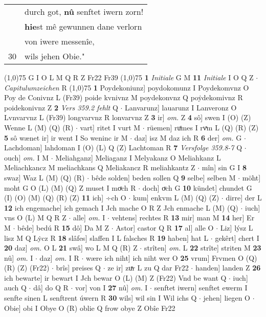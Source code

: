 \documentclass[8pt,a4paper,notitlepage]{article}
\begin{document}
\begin{table}[ht]
\begin{minipage}[t]{0.5\linewidth}
\begin{tabular}{rl}
 & durch got, \textbf{nû} senftet iwern zorn!\\ 
 & \textbf{hie}st mê gewunnen dane verlorn\\ 
 & von iwere messenîe,\\ 
30 & wils jehen Obie."\\ 
\end{tabular}
\scriptsize
\line(1,0){75} \newline
G I O L M Q R Z Fr22 Fr39 \newline
\line(1,0){75} \newline
\textbf{1} \textit{Initiale} G M  \textbf{11} \textit{Initiale} I O Q Z   $\cdot$ \textit{Capitulumzeichen} R  \newline
\line(1,0){75} \newline
\textbf{1} Poydekoniunz] poydokomunz I Poydekomvnz O Poy de Conivnz L (Fr39) poide kvnivnz M poydekonvnz Q poẏdekomivnz R poidekonivnz Z \textbf{2} \textit{Vers 359.2 fehlt} Q   $\cdot$ Lanvarunz] lauarunz I Lanveronz O Lvnvarvnz L (Fr39) longvarvnz R lonvarvnz Z \textbf{3} ir] \textit{om.} Z \textbf{4} sô] swen I (O) (Z) Wenne L (M) (Q) (R)  $\cdot$ vart] ritet I vurt M  $\cdot$ rüemen] ruͤmes I rvͯm L (Q) (R) (Z) \textbf{5} sô wænet ir] ir went I So weninc ir M  $\cdot$ daz] isz M daz ich R \textbf{6} der] \textit{om.} G  $\cdot$ Lachdoman] lahdoman I (O) (L) Q (Z) Lachtoman R \textbf{7} \textit{Versfolge 359.8-7} Q   $\cdot$ ouch] \textit{om.} I M  $\cdot$ Meliahganz] Meliaganz I Melyakanz O Meliahkanz L Meliachkancz M meliachkans Q Meliakancz R meliahkantz Z  $\cdot$ mîn] sin G I \textbf{8} swaz] Waz L (M) (Q) (R)  $\cdot$ bêde solden] beden sollen Q \textbf{9} selbe] selben M  $\cdot$ möht] moht G O (L) (M) (Q) Z muset I moͯch R  $\cdot$ doch] oͮch G \textbf{10} kündet] chundet G (I) (O) (M) (Q) (R) (Z) \textbf{11} ich] ÷ch O  $\cdot$ kum] enkvm L (M) (Q) (Z)  $\cdot$ dirre] der L \textbf{12} ich engemache] ich gemach I Jch mache O R Z Jch enmache L (M) (Q)  $\cdot$ iuch] vns O (L) M Q R Z  $\cdot$ alle] \textit{om.} I  $\cdot$ vehtens] rechtes R \textbf{13} mir] man M \textbf{14} her] Er M  $\cdot$ bêde] bedú R \textbf{15} dô] Da M Z  $\cdot$ Astor] castor Q R \textbf{17} al] alle O  $\cdot$ Liz] lýsz L lisz M Q Lẏcz R \textbf{18} slâfes] slaffen I L falsches R \textbf{19} haben] hat L  $\cdot$ gekêrt] chert I \textbf{20} daz] \textit{om.} O L \textbf{21} swâ] wo L M Q (R) Z  $\cdot$ strîten] \textit{om.} L \textbf{22} strîte] striten M \textbf{23} nû] \textit{om.} I  $\cdot$ daz] \textit{om.} I R  $\cdot$ wære ich niht] ich niht wer O \textbf{25} vrum] Frvmen O (Q) (R) (Z) (Fr22)  $\cdot$ brîs] preises Q  $\cdot$ ze ir] zuͯr L zu Q dar Fr22  $\cdot$ handen] landen Z \textbf{26} ich bewarte] ir bewart I Jch bewar O (L) (M) Z (Fr22) Vnd be want Q  $\cdot$ iuch] auch Q  $\cdot$ dâ] do Q R  $\cdot$ vor] von I \textbf{27} nû] \textit{om.} I  $\cdot$ senftet iwern] senftet ewerm I senfte sinen L senftrent úwern R \textbf{30} wils] wil sin I Wil ichs Q  $\cdot$ jehen] liegen O  $\cdot$ Obie] obi I Obye O (R) oblie Q frow obye Z Obîe Fr22 \newline

\end{minipage}
\end{table}
\end{document}
